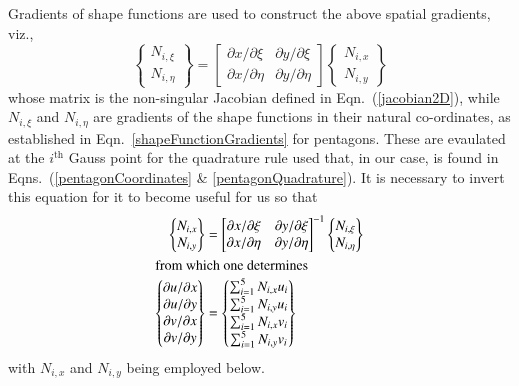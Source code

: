Gradients of shape functions are used to construct the above spatial gradients, viz.,
\begin{displaymath}
\begin{Bmatrix} 
N_{i,\xi} \\ 
N_{i,\eta}
\end{Bmatrix} = \begin{bmatrix}
\partial x / \partial \xi & \partial y / \partial \xi \\
\partial x / \partial \eta & \partial y / \partial \eta
\end{bmatrix} \begin{Bmatrix}
N_{i,x} \\
N_{i,y}
\end{Bmatrix}
\end{displaymath}
whose matrix is the non-singular Jacobian defined in Eqn.~(\ref{jacobian2D}), while $N_{i,\xi}$ and $N_{i,\eta}$ are gradients of the shape functions in their natural co-ordinates, as established in Eqn.~\eqref{shapeFunctionGradients} for pentagons.  These are evaulated at the $i^{\text{th}}$ Gauss point for the quadrature rule used that, in our case, is found in Eqns.~(\ref{pentagonCoordinates} \& \ref{pentagonQuadrature}).  It is necessary to invert this equation for it to become useful for us so that
\begin{subequations}
    \label{pentagonGrads}
    \begin{align}
    \begin{Bmatrix} 
    N_{i,x} \\ 
    N_{i,y}
    \end{Bmatrix} & = \begin{bmatrix}
    \partial x / \partial \xi & \partial y / \partial \xi \\
    \partial x / \partial \eta & \partial y / \partial \eta
    \end{bmatrix}^{-1} \begin{Bmatrix}
    N_{i,\xi} \\
    N_{i,\eta}
    \end{Bmatrix} \\
    \intertext{from which one determines}
    \begin{Bmatrix}
    \partial u / \partial x \\
    \partial u / \partial y \\
    \partial v / \partial x \\
    \partial v / \partial y 
    \end{Bmatrix} & = \begin{Bmatrix}
    \sum\nolimits_{i=1}^5 N_{i,x} u_i \\
    \sum\nolimits_{i=1}^5 N_{i,y} u_i \\
    \sum\nolimits_{i=1}^5 N_{i,x} v_i \\
    \sum\nolimits_{i=1}^5 N_{i,y} v_i
    \end{Bmatrix}
    \end{align}
\end{subequations}
with $N_{i,x}$ and $N_{i,y}$ being employed below.

